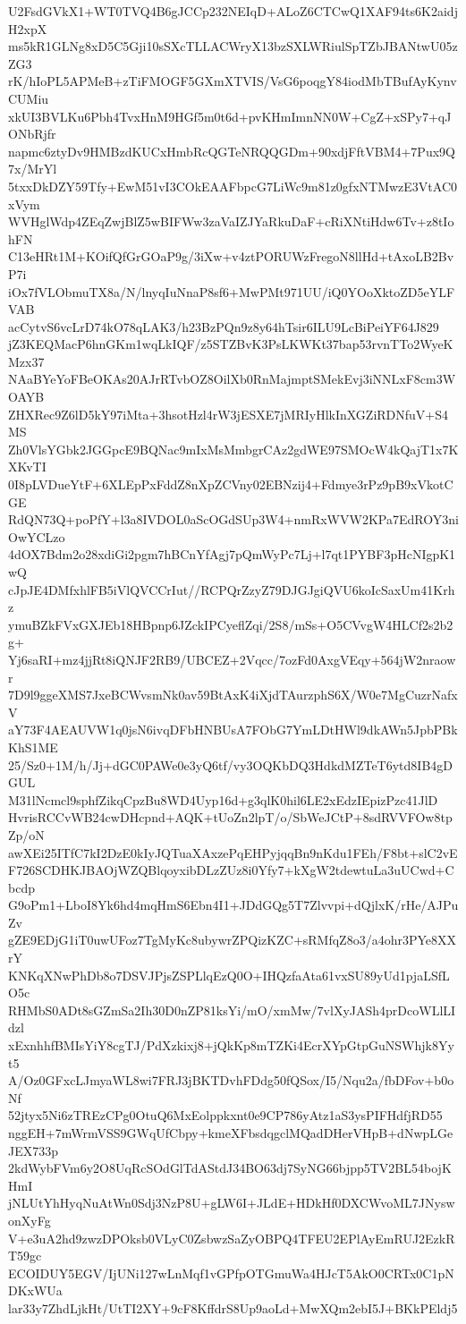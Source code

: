 U2FsdGVkX1+WT0TVQ4B6gJCCp232NEIqD+ALoZ6CTCwQ1XAF94ts6K2aidjH2xpX
ms5kR1GLNg8xD5C5Gji10sSXcTLLACWryX13bzSXLWRiulSpTZbJBANtwU05zZG3
rK/hIoPL5APMeB+zTiFMOGF5GXmXTVIS/VsG6poqgY84iodMbTBufAyKynvCUMiu
xkUI3BVLKu6Pbh4TvxHnM9HGf5m0t6d+pvKHmImnNN0W+CgZ+xSPy7+qJONbRjfr
napmc6ztyDv9HMBzdKUCxHmbRcQGTeNRQQGDm+90xdjFftVBM4+7Pux9Q7x/MrYl
5txxDkDZY59Tfy+EwM51vI3COkEAAFbpcG7LiWc9m81z0gfxNTMwzE3VtAC0xVym
WVHglWdp4ZEqZwjBlZ5wBIFWw3zaVaIZJYaRkuDaF+cRiXNtiHdw6Tv+z8tIohFN
C13eHRt1M+KOifQfGrGOaP9g/3iXw+v4ztPORUWzFregoN8llHd+tAxoLB2BvP7i
iOx7fVLObmuTX8a/N/lnyqIuNnaP8sf6+MwPMt971UU/iQ0YOoXktoZD5eYLFVAB
acCytvS6vcLrD74kO78qLAK3/h23BzPQn9z8y64hTsir6ILU9LcBiPeiYF64J829
jZ3KEQMacP6hnGKm1wqLkIQF/z5STZBvK3PsLKWKt37bap53rvnTTo2WyeKMzx37
NAaBYeYoFBeOKAs20AJrRTvbOZ8OilXb0RnMajmptSMekEvj3iNNLxF8cm3WOAYB
ZHXRec9Z6lD5kY97iMta+3hsotHzl4rW3jESXE7jMRIyHlkInXGZiRDNfuV+S4MS
Zh0VlsYGbk2JGGpcE9BQNac9mIxMsMmbgrCAz2gdWE97SMOcW4kQajT1x7KXKvTI
0I8pLVDueYtF+6XLEpPxFddZ8nXpZCVny02EBNzij4+Fdmye3rPz9pB9xVkotCGE
RdQN73Q+poPfY+l3a8IVDOL0aScOGdSUp3W4+nmRxWVW2KPa7EdROY3niOwYCLzo
4dOX7Bdm2o28xdiGi2pgm7hBCnYfAgj7pQmWyPc7Lj+l7qt1PYBF3pHcNIgpK1wQ
cJpJE4DMfxhlFB5iVlQVCCrIut//RCPQrZzyZ79DJGJgiQVU6koIcSaxUm41Krhz
ymuBZkFVxGXJEb18HBpnp6JZckIPCyeflZqi/2S8/mSs+O5CVvgW4HLCf2s2b2g+
Yj6saRI+mz4jjRt8iQNJF2RB9/UBCEZ+2Vqcc/7ozFd0AxgVEqy+564jW2nraowr
7D9l9ggeXMS7JxeBCWvsmNk0av59BtAxK4iXjdTAurzphS6X/W0e7MgCuzrNafxV
aY73F4AEAUVW1q0jsN6ivqDFbHNBUsA7FObG7YmLDtHWl9dkAWn5JpbPBkKhS1ME
25/Sz0+1M/h/Jj+dGC0PAWe0e3yQ6tf/vy3OQKbDQ3HdkdMZTeT6ytd8IB4gDGUL
M31lNcmcl9sphfZikqCpzBu8WD4Uyp16d+g3qlK0hil6LE2xEdzIEpizPzc41JlD
HvrisRCCvWB24cwDHcpnd+AQK+tUoZn2lpT/o/SbWeJCtP+8sdRVVFOw8tpZp/oN
awXEi25ITfC7kI2DzE0kIyJQTuaXAxzePqEHPyjqqBn9nKdu1FEh/F8bt+slC2vE
F726SCDHKJBAOjWZQBlqoyxibDLzZUz8i0Yfy7+kXgW2tdewtuLa3uUCwd+Cbcdp
G9oPm1+LboI8Yk6hd4mqHmS6Ebn4I1+JDdGQg5T7Zlvvpi+dQjlxK/rHe/AJPuZv
gZE9EDjG1iT0uwUFoz7TgMyKc8ubywrZPQizKZC+sRMfqZ8o3/a4ohr3PYe8XXrY
KNKqXNwPhDb8o7DSVJPjsZSPLlqEzQ0O+IHQzfaAta61vxSU89yUd1pjaLSfLO5c
RHMbS0ADt8sGZmSa2Ih30D0nZP81ksYi/mO/xmMw/7vlXyJASh4prDcoWLlLIdzl
xExnhhfBMIsYiY8cgTJ/PdXzkixj8+jQkKp8mTZKi4EcrXYpGtpGuNSWhjk8Yyt5
A/Oz0GFxcLJmyaWL8wi7FRJ3jBKTDvhFDdg50fQSox/I5/Nqu2a/fbDFov+b0oNf
52jtyx5Ni6zTREzCPg0OtuQ6MxEolppkxnt0e9CP786yAtz1aS3ysPIFHdfjRD55
nggEH+7mWrmVSS9GWqUfCbpy+kmeXFbsdqgclMQadDHerVHpB+dNwpLGeJEX733p
2kdWybFVm6y2O8UqRcSOdGlTdAStdJ34BO63dj7SyNG66bjpp5TV2BL54bojKHmI
jNLUtYhHyqNuAtWn0Sdj3NzP8U+gLW6I+JLdE+HDkHf0DXCWvoML7JNyswonXyFg
V+e3uA2hd9zwzDPOksb0VLyC0ZsbwzSaZyOBPQ4TFEU2EPlAyEmRUJ2EzkRT59gc
ECOIDUY5EGV/IjUNi127wLnMqf1vGPfpOTGmuWa4HJcT5AkO0CRTx0C1pNDKxWUa
lar33y7ZhdLjkHt/UtTI2XY+9cF8KffdrS8Up9aoLd+MwXQm2ebI5J+BKkPEldj5
